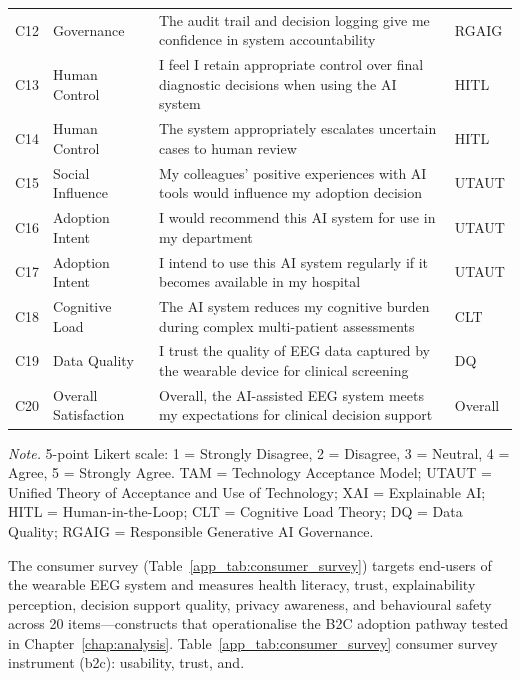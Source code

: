 {\begin{xltabular}{\textwidth}{@{} >{\raggedright\arraybackslash}p{0.5cm} >{\raggedright\arraybackslash}p{2.5cm} L p{1.5cm} @{}}
\addlinespace
C12 & Governance & The audit trail and decision logging give me confidence in system accountability & RGAIG \\
\addlinespace
C13 & Human Control & I feel I retain appropriate control over final diagnostic decisions when using the AI system & HITL \\
\addlinespace
C14 & Human Control & The system appropriately escalates uncertain cases to human review & HITL \\
\addlinespace
C15 & Social Influence & My colleagues' positive experiences with AI tools would influence my adoption decision & UTAUT \\
\addlinespace
C16 & Adoption Intent & I would recommend this AI system for use in my department & UTAUT \\
\addlinespace
C17 & Adoption Intent & I intend to use this AI system regularly if it becomes available in my hospital & UTAUT \\
\addlinespace
C18 & Cognitive Load & The AI system reduces my cognitive burden during complex multi-patient assessments & CLT \\
\addlinespace
C19 & Data Quality & I trust the quality of EEG data captured by the wearable device for clinical screening & DQ \\
\addlinespace
C20 & Overall Satisfaction & Overall, the AI-assisted EEG system meets my expectations for clinical decision support & Overall \\
\end{xltabular}}
\vspace{0.5em}\noindent\textit{Note.} 5-point Likert scale: 1 = Strongly Disagree, 2 = Disagree, 3 = Neutral, 4 = Agree, 5 = Strongly Agree. TAM = Technology Acceptance Model; UTAUT = Unified Theory of Acceptance and Use of Technology; XAI = Explainable AI; HITL = Human-in-the-Loop; CLT = Cognitive Load Theory; DQ = Data Quality; RGAIG = Responsible Generative AI Governance.

\noindent The consumer survey (Table~\ref{app_tab:consumer_survey}) targets end-users of the wearable EEG system and measures health literacy, trust, explainability perception, decision support quality, privacy awareness, and behavioural safety across 20 items---constructs that operationalise the B2C adoption pathway tested in Chapter~\ref{chap:analysis}.
\noindent Table~\ref{app_tab:consumer_survey} consumer survey instrument (b2c): usability, trust, and.

